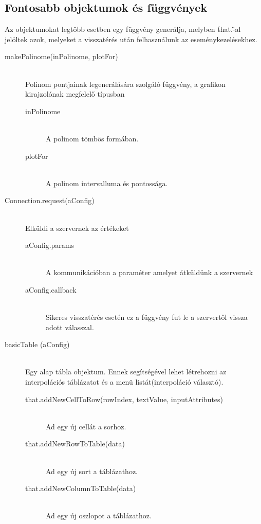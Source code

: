 \subsection{Fontosabb objektumok és függvények}
	\hfill
	Az objektumokat legtöbb esetben egy függvény generálja, melyben \"that.\"-al jelöltek azok, melyeket a visszatérés után felhasználunk az eseménykezelésekhez.
	\begin{description}
		\item[makePolinome(inPolinome, plotFor)] \hfill \\ 
			Polinom pontjainak legenerálására szolgáló függvény, a grafikon kirajzolónak megfelelő típusban
			\begin{description}
				\item[inPolinome] \hfill \\ 
					A polinom tömbös formában.
				\item[plotFor] \hfill \\ 
					A polinom intervalluma és pontossága.
			\end{description}
		\item[Connection.request(aConfig)] \hfill \\ 
			Elküldi a szervernek az értékeket
			\begin{description}
				\item[aConfig.params] \hfill \\
				A kommunikációban a paraméter amelyet átküldünk a szervernek
				\item[aConfig.callback] \hfill \\
				Sikeres visszatérés esetén ez a függvény fut le a szervertől vissza adott válasszal. 
			\end{description}
		\item[basicTable (aConfig)] \hfill \\ 
			Egy alap tábla objektum. Ennek segítségével lehet létrehozni az interpolációs táblázatot és a menü listát(interpoláció választó).
			\begin{description}
			\item[that.addNewCellToRow(rowIndex, textValue, inputAttributes)] 
				\hfill \\  Ad egy új cellát a sorhoz.
			\item[that.addNewRowToTable(data)]
				\hfill \\ Ad egy új sort a táblázathoz.
			\item[that.addNewColumnToTable(data)]
				\hfill \\ Ad egy új oszlopot a táblázathoz.

\end{description}
\end{description}
